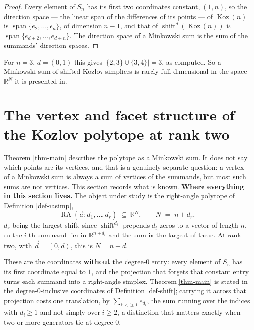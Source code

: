 \documentclass[11pt, a4paper, abstract=yes]{scrartcl}
\theoremstyle{definition}
\theoremstyle{remark}
\theoremstyle{plain}
\newcommand{\Koz}{\operatorname{Koz}}
\newcommand{\shift}{\operatorname{shift}}
\newcommand{\RA}{\operatorname{RA}}
\begin{document}
\begin{proof}
Every element of \(S_n\) has its first two coordinates constant, \((1,n)\), so the direction space
--- the linear span of the differences of its points --- of
\(\Koz(n)\) is \(\operatorname{span}\lbrace e_2,\dots,e_n\rbrace\), of dimension \(n-1\), and that of
\(\shift^{d}(\Koz(n))\) is \(\operatorname{span}\lbrace e_{d+2},\dots,e_{d+n}\rbrace\). The direction
space of a Minkowski sum is the sum of the summands' direction spaces.
\end{proof}

For \(n=3\), \(d=(0,1)\) this gives \(|\lbrace2,3\rbrace\cup\lbrace3,4\rbrace|=3\), as computed. So a Minkowski sum of shifted Kozlov simplices is rarely
full-dimensional in the space \(\mathbb R^N\) it is presented in.
\section{The vertex and facet structure of the Kozlov polytope at rank two}
\label{sec-vertices}
Theorem \ref{thm-main} describes the polytope as a Minkowski sum. It does not say which points are its
vertices, and that is a genuinely separate question: a vertex of a Minkowski sum is always a sum of
vertices of the summands, but most such sums are not vertices. This section records what is known.
\textbf{\textbf{Where everything in this section lives.}} The object under study is the right-angle polytope of
Definition \ref{def-rasimp},
\begin{equation}\label{eq:dimension-2}
  \RA(\vec a;d_1,\dots,d_r)\;\subseteq\;\mathbb R^N,
  \qquad N\;=\;n+d_r ,
\end{equation}
\(d_r\) being the largest shift, since \(\shift^{d_i}\) prepends \(d_i\) zeros to a vector of length
\(n\), so the \(i\)-th summand lies in \(\mathbb R^{n+d_i}\) and the sum in the largest of these.
At rank two, with \(\vec d=(0,d)\), this is \(N=n+d\).

These are the coordinates \textbf{without} the degree-\(0\) entry: every element of \(S_n\) has
its first coordinate equal to \(1\), and the projection that forgets that constant entry turns each
summand into a right-angle simplex. Theorem \ref{thm-main} is stated in the degree-\(0\)-inclusive
coordinates of Definition \ref{def-shift}; carrying it across that projection costs one translation,
by \(\sum_{i:\,d_i\ge1}e_{d_i}\), the sum running over the indices with \(d_i\ge1\) and not
simply over \(i\ge2\), a distinction that matters exactly when two or more generators tie at
degree \(0\).
\end{document}

